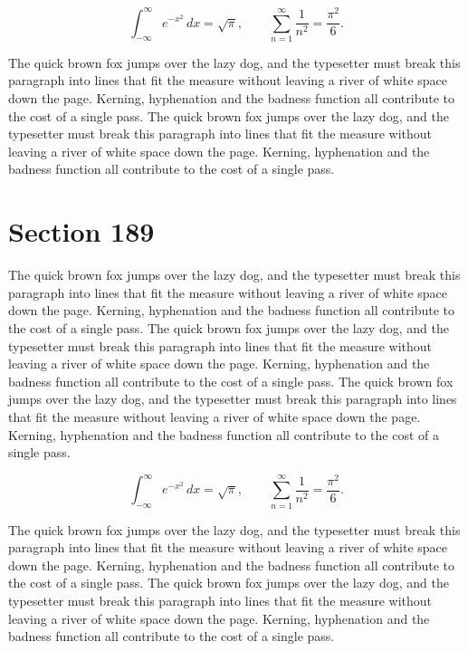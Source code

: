 \documentclass{article}
\begin{document}
\begin{equation}
\int_{-\infty}^{\infty} e^{-x^{2}}\,dx = \sqrt{\pi}, \qquad
\sum_{n=1}^{\infty} \frac{1}{n^{2}} = \frac{\pi^{2}}{6}.
\end{equation}

The quick brown fox jumps over the lazy dog, and the typesetter must break this paragraph into lines that fit the measure without leaving a river of white space down the page. Kerning, hyphenation and the badness function all contribute to the cost of a single pass. The quick brown fox jumps over the lazy dog, and the typesetter must break this paragraph into lines that fit the measure without leaving a river of white space down the page. Kerning, hyphenation and the badness function all contribute to the cost of a single pass. 
\section{Section 189}
The quick brown fox jumps over the lazy dog, and the typesetter must break this paragraph into lines that fit the measure without leaving a river of white space down the page. Kerning, hyphenation and the badness function all contribute to the cost of a single pass. The quick brown fox jumps over the lazy dog, and the typesetter must break this paragraph into lines that fit the measure without leaving a river of white space down the page. Kerning, hyphenation and the badness function all contribute to the cost of a single pass. The quick brown fox jumps over the lazy dog, and the typesetter must break this paragraph into lines that fit the measure without leaving a river of white space down the page. Kerning, hyphenation and the badness function all contribute to the cost of a single pass. 

\begin{equation}
\int_{-\infty}^{\infty} e^{-x^{2}}\,dx = \sqrt{\pi}, \qquad
\sum_{n=1}^{\infty} \frac{1}{n^{2}} = \frac{\pi^{2}}{6}.
\end{equation}

The quick brown fox jumps over the lazy dog, and the typesetter must break this paragraph into lines that fit the measure without leaving a river of white space down the page. Kerning, hyphenation and the badness function all contribute to the cost of a single pass. The quick brown fox jumps over the lazy dog, and the typesetter must break this paragraph into lines that fit the measure without leaving a river of white space down the page. Kerning, hyphenation and the badness function all contribute to the cost of a single pass. 
\end{document}
